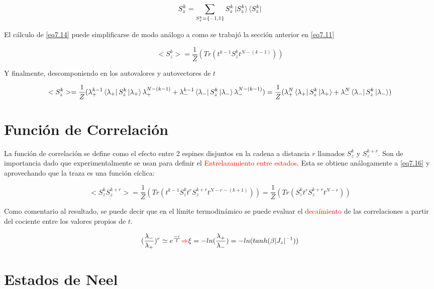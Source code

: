 \documentclass{book}
\begin{document}
\begin{equation}\label{eq7.15} S^k_z= \sum_{S^k_z=\{-1,1\}}S^k_z\ket{S^k_z}\bra{S^k_z}\end{equation}

El cálculo de \ref{eq7.14} puede simplificarse de modo análogo a como se trabajó la sección anterior en \ref{eq7.11}

\begin{equation}\label{eq7.16} <S_z^k> =\frac{1}{Z}(Tr(t^{k-1}S_z^k t^{N-(k-1)}))\end{equation}

Y finalmente, descomponiendo en los autovalores y autovectores de $t$

\begin{equation}\label{eq7.17} <S_z^k> =\frac{1}{Z}(\lambda_+^{k-1}\bra{\lambda_+}S_z^k\ket{\lambda_+}\lambda_+^{N-(k-1)}+\lambda_-^{k-1}\bra{\lambda_-}S_z^k\ket{\lambda_-}\lambda_-^{N-(k-1)})=\frac{1}{Z}(\lambda_+^N\bra{\lambda_+}S_z^k\ket{\lambda_+}+\lambda_-^N\bra{\lambda_-}S_z^k\ket{\lambda_-})\end{equation}
\section{Función de Correlación}

La función de correlación se define como el efecto entre 2 espines disjuntos en la cadena a distancia $r$ llamados $S_z^k$ y $S_z^{k+r}$. Son de importancia dado que experimentalmente se usan para definir el \textcolor{red}{Entrelazamiento entre estados}. Esta se obtiene análogamente a \ref{eq7.16} y aprovechando que la traza es una función cíclica:

\begin{equation}\label{eq7.18}<S_z^kS_z^{k+r}>=\frac{1}{Z}(Tr(t^{k-1}S_z^kt^{r}S_z^{k+r}t^{N-r-(k+1)}))=\frac{1}{Z}(Tr(S_z^kt^rS_z^{k+r}t^{N-r}))\end{equation}

Como comentario al resultado, se puede decir que en el límite termodinámico se puede evaluar el \textcolor{red}{decaímiento} de las correlaciones a partir del cociente entre los valores propios de $t$.

\begin{equation}\label{eq7.19} (\frac{\lambda_-}{\lambda_+})^r \simeq e^{\frac{-r}{\xi}} \textcolor{red}{\Rightarrow} \xi= -ln(\frac{\lambda_+}{\lambda_-})=-ln(tanh(\beta\lvert J_z\rvert^{-1}))\end{equation}
\section{Estados de Neel}
\end{document}
